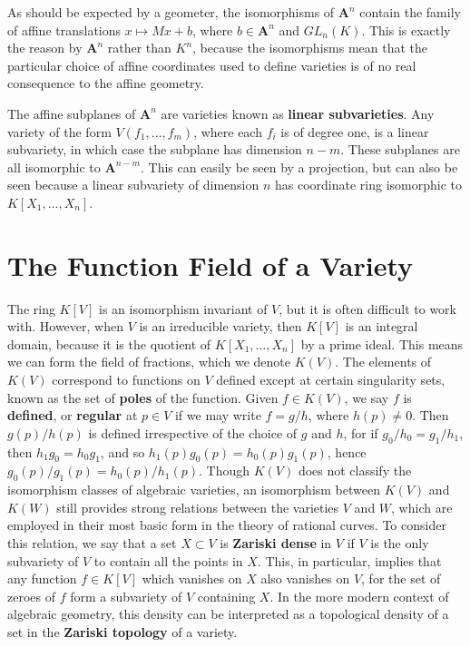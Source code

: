 As should be expected by a geometer, the isomorphisms of $\mathbf{A}^n$ contain the family of affine translations $x \mapsto Mx + b$, where $b \in \mathbf{A}^n$ and $GL_n(K)$. This is exactly the reason by $\mathbf{A}^n$ rather than $K^n$, because the isomorphisms mean that the particular choice of affine coordinates used to define varieties is of no real consequence to the affine geometry.

\begin{example}
    The affine subplanes of $\mathbf{A}^n$ are varieties known as {\bf linear subvarieties}. Any variety of the form $V(f_1, \dots, f_m)$, where each $f_i$ is of degree one, is a linear subvariety, in which case the subplane has dimension $n-m$. These subplanes are all isomorphic to $\mathbf{A}^{n-m}$. This can easily be seen by a projection, but can also be seen because a linear subvariety of dimension $n$ has coordinate ring isomorphic to $K[X_1, \dots, X_n]$.
\end{example}

\section{The Function Field of a Variety}

The ring $K[V]$ is an isomorphism invariant of $V$, but it is often difficult to work with. However, when $V$ is an irreducible variety, then $K[V]$ is an integral domain, because it is the quotient of $K[X_1, \dots, X_n]$ by a prime ideal. This means we can form the field of fractions, which we denote $K(V)$. The elements of $K(V)$ correspond to functions on $V$ defined except at certain singularity sets, known as the set of {\bf poles} of the function. Given $f \in K(V)$, we say $f$ is {\bf defined}, or {\bf regular} at $p \in V$ if we may write $f = g/h$, where $h(p) \neq 0$. Then $g(p)/h(p)$ is defined irrespective of the choice of $g$ and $h$, for if $g_0/h_0 = g_1/h_1$, then $h_1g_0 = h_0g_1$, and so $h_1(p)g_0(p) = h_0(p)g_1(p)$, hence $g_0(p)/g_1(p) = h_0(p)/h_1(p)$. Though $K(V)$ does not classify the isomorphism classes of algebraic varieties, an isomorphism between $K(V)$ and $K(W)$ still provides strong relations between the varieties $V$ and $W$, which are employed in their most basic form in the theory of rational curves. To consider this relation, we say that a set $X \subset V$ is {\bf Zariski dense} in $V$ if $V$ is the only subvariety of $V$ to contain all the points in $X$. This, in particular, implies that any function $f \in K[V]$ which vanishes on $X$ also vanishes on $V$, for the set of zeroes of $f$ form a subvariety of $V$ containing $X$. In the more modern context of algebraic geometry, this density can be interpreted as a topological density of a set in the {\bf Zariski topology} of a variety.

